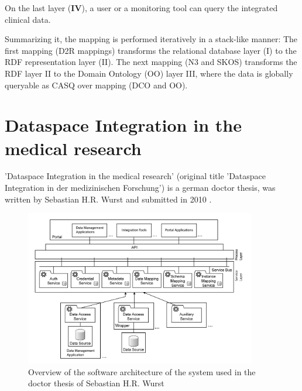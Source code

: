 On the last layer (\textbf{IV}), a user or a monitoring tool can query the integrated clinical data.

Summarizing it, the mapping is performed iteratively in a stack-like manner:
The first mapping \textalpha (D2R mappings) transforms the relational database layer (I) to the RDF representation layer (II). The next mapping \textbeta (N3 and SKOS) transforms the RDF layer II to the Domain Ontology (OO) layer III, where the data is globally queryable as CASQ over mapping \textgamma (DCO and OO).  

\section{Dataspace Integration in the medical research}

'Dataspace Integration in the medical research' (original title 'Dataspace Integration in der medizinischen Forschung') is a german doctor thesis, was written by Sebastian H.R. Wurst and submitted in 2010 \cite{WurstDiss}.

\begin{figure}[H]
	\begin{center}
		\includegraphics[width=0.9\textwidth]{figures/DataspaceIntegrationInDerMedForschungFigure31.PNG}
	\end{center}
	\caption{Overview of the software architecture of the system used in the doctor thesis of Sebastian H.R. Wurst \cite[p. 117, Figure 31]{WurstDiss}}
	\label{DebugITArchitectureFigure}
\end{figure}